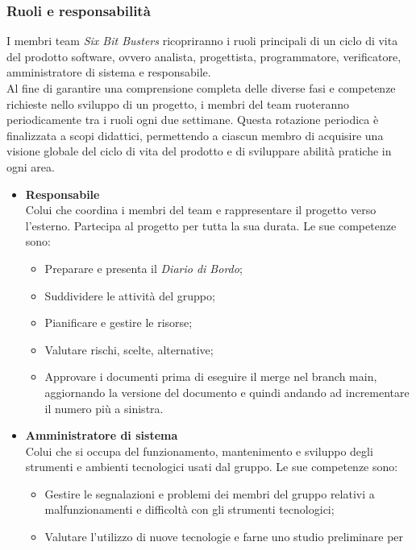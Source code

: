 \subsubsection{Ruoli e responsabilità}
I membri team \textit{Six Bit Busters} ricopriranno i ruoli principali di un
ciclo di vita del prodotto software, ovvero analista, progettista,
programmatore, verificatore, amministratore di sistema e responsabile. \\ Al
fine di garantire una comprensione completa delle diverse fasi e competenze
richieste nello sviluppo di un progetto, i membri del team ruoteranno
periodicamente tra i ruoli ogni due settimane. Questa rotazione periodica è
finalizzata a scopi didattici, permettendo a ciascun membro di acquisire una
visione globale del ciclo di vita del prodotto e di sviluppare abilità pratiche
in ogni area.
\begin{itemize}
    \item \textbf{Responsabile}\\
          Colui che coordina i membri del team e rappresentare il progetto verso l'esterno.
          Partecipa al progetto per tutta la sua durata.
          Le sue competenze sono:
          \begin{itemize}
              \item Preparare e presenta il \textit{Diario di Bordo};
              \item Suddividere le attività del gruppo;
              \item Pianificare e gestire le risorse;
              \item Valutare rischi, scelte, alternative;
              \item Approvare i documenti prima di eseguire il merge nel branch main, aggiornando
                    la versione del documento e quindi andando ad incrementare il numero più a
                    sinistra.
          \end{itemize}
    \item \textbf{Amministratore di sistema}\\
          Colui che si occupa del funzionamento, mantenimento e sviluppo degli strumenti e ambienti tecnologici
          usati dal gruppo.
          Le sue competenze sono:
          \begin{itemize}
              \item Gestire le segnalazioni e problemi dei membri del gruppo relativi a
                    malfunzionamenti e difficoltà con gli strumenti tecnologici;
              \item Valutare l'utilizzo di nuove tecnologie e farne uno studio preliminare per

\end{itemize}
\end{itemize}
